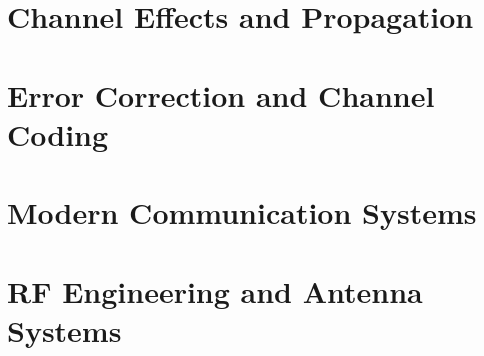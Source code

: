 \documentclass[11pt,twoside,openany]{book}
\begin{document}
\part{Channel Effects and Propagation}

\part{Error Correction and Channel Coding}

\part{Modern Communication Systems}

\part{RF Engineering and Antenna Systems}
\end{document}
